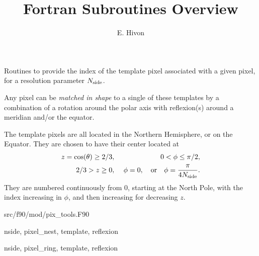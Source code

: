 
\sloppy


\title{\healpix Fortran Subroutines Overview}
 \section[template\_pixel\_nest, template\_pixel\_ring]{ }
\label{sub:template_pixel_xxx}
\author{E. Hivon}

\begin{facility}
{Routines to provide the index of the template pixel associated with a given
  \healpix pixel, for a resolution parameter ${N_{\rm side}}$. 

Any pixel can be {\em matched in shape}
  to a single of these templates by a combination of  a rotation around the polar axis with 
  reflexion(s) around a meridian and/or the equator. 

The template pixels are all located in the Northern Hemisphere, or on the
 Equator.
They are chosen to have their center located at
\begin{eqnarray}
     z=\cos(\theta)\ge 2/3,  &\ &    0< \phi \leq \pi/2,   \nonumber\\            %
     2/3 > z \geq 0,  &\ & \phi=0, \quad{\rm or}\quad  \phi=\frac{\pi}{4\nside}.  \nonumber %
\myhtmlimage{}
\end{eqnarray}
 They are numbered continuously from 0, starting at the North Pole, with the index
 increasing in $\phi$, and then increasing for decreasing $z$.
}
{src/f90/mod/pix\_tools.F90}
\end{facility}

\begin{f90format}
{nside, pixel\_nest, template, reflexion}
\end{f90format}
\begin{f90format}
{nside, pixel\_ring, template, reflexion}
\end{f90format}

